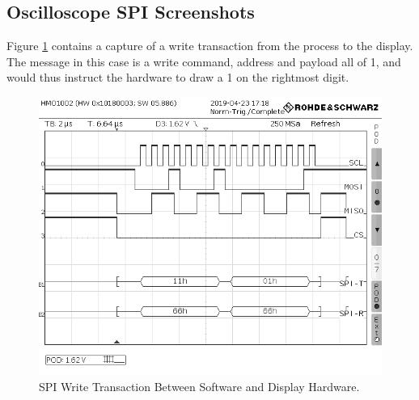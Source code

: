 \documentclass[11pt,british]{report}
\begin{document}
\subsection*{Oscilloscope SPI Screenshots}
Figure \ref{fig:SPI} contains a capture of a write transaction from the process to the display. The message in this case is a write command, address and payload all of 1, and would thus instruct the hardware to draw a 1 on the rightmost digit.
\begin{figure}[h]
	\centering
	\includegraphics[width=\textwidth]{LAB-03}
	\caption{SPI Write Transaction Between Software and Display Hardware.}
	\label{fig:SPI}
\end{figure}
\end{document}
